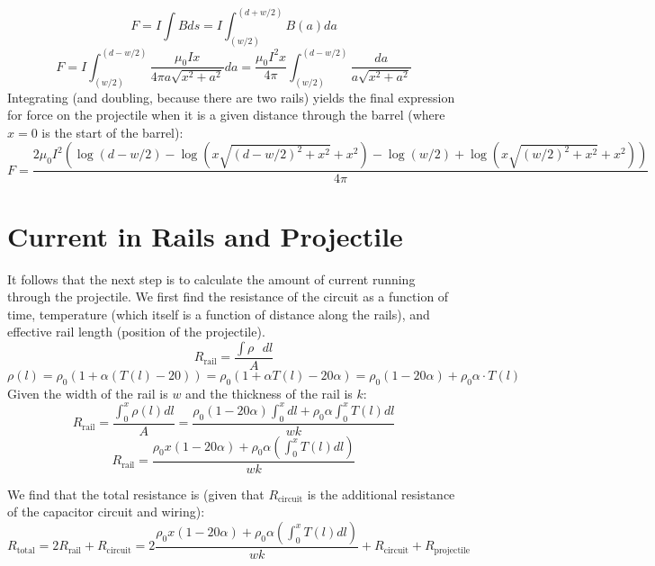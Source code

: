 \documentclass[12pt]{article}
\begin{document}
\begin{equation}
    F = I \int B ds = I \int_{(w/2)}^{(d + w/2)} B(a) da
\end{equation}
\begin{equation}
    F = I \int_{(w/2)}^{(d - w/2)} \frac{\mu_0 I x}{4\pi a \sqrt{x^2 + a^2}} da = 
    \frac{\mu_0 I^2 x}{4\pi} \int_{(w/2)}^{(d - w/2)} \frac{da}{a \sqrt{x^2 + a^2}}
\end{equation}
Integrating (and doubling, because there are two rails) yields the final expression for force on the projectile when it is a given distance through the barrel (where $x = 0$ is the start of the barrel):
\begin{equation}
    F =
    \frac{2\mu_0 I^2 (\log(d - w/2) - \log(x\sqrt{(d - w/2)^2 + x^2} + x^2) - \log(w/2) + \log(x\sqrt{(w/2)^2 + x^2} + x^2))}{4\pi}
    \label{eqn:eqn1}
\end{equation}

\section{Current in Rails and Projectile}
It follows that the next step is to calculate the amount of current running through the projectile. We first find the resistance of the circuit as a function of time, temperature (which itself is a function of distance along the rails), and effective rail length (position of the projectile).
\begin{equation}
R_{\text{rail}} = \frac{\int\rho\text{ }dl}{A}
\end{equation}
\begin{equation}
\rho(l) = \rho_{0}(1 + \alpha (T(l) - 20)) = \rho_{0}(1 + \alpha T(l) - 20\alpha) = \rho_{0}(1 - 20\alpha) + \rho_{0}\alpha \cdot T(l)
\end{equation}
Given the width of the rail is $w$ and the thickness of the rail is $k$:
\begin{equation}
R_{\text{rail}} = \frac{\int_{0}^{x} \rho(l) dl}{A} = \frac{\rho_{0}(1 - 20\alpha) \int_{0}^{x} dl + \rho_{0}\alpha \int_{0}^{x} T(l) dl}{wk}
\end{equation}
\begin{equation}
R_{\text{rail}} = \frac{\rho_{0}x(1 - 20\alpha) + \rho_{0}\alpha (\int_{0}^{x} T(l) dl)}{wk}
\label{eqn:eqn2}
\end{equation}

We find that the total resistance is (given that $R_{\text{circuit}}$ is the additional resistance of the capacitor circuit and wiring):
\begin{equation}
R_{\text{total}} = 2R_{\text{rail}} + R_{\text{circuit}} = 2\frac{\rho_{0}x(1 - 20\alpha) + \rho_{0}\alpha (\int_{0}^{x} T(l) dl)}{wk} + R_{\text{circuit}} + R_{\text{projectile}}
\label{eqn:eqn3}
\end{equation}
\end{document}
